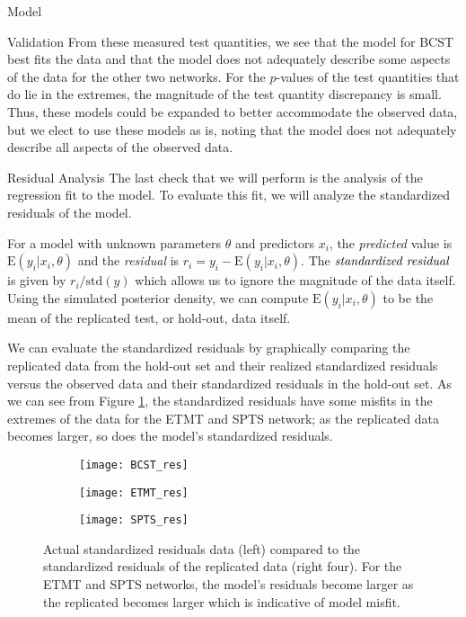 \begin{chapter}{Model}
\begin{section}{Validation}
    From these measured test quantities, we see that the model for BCST best fits the data and that
    the model does not adequately describe some aspects of the data for the other two networks.
    For the $p$-values of the test quantities that do lie in the extremes, the magnitude
    of the test quantity discrepancy is small. Thus, these models could be expanded to better accommodate
    the observed data, but we elect to use these models as is, noting that the
    model does not adequately describe all aspects of the observed data.

  \begin{subsection}{Residual Analysis}
    The last check that we will perform is the analysis of the regression fit to the
    model. To evaluate this fit, we will analyze the standardized residuals of the model.

    For a model with unknown parameters $\theta$ and predictors $x_i$, the \emph{predicted}
    value is $\text{E}(y_i | x_i, \theta)$ and the \emph{residual} is $r_i = y_i - \text{E}(y_i | x_i, \theta)$.
    The $\emph{standardized residual}$ is given by $r_i / \text{std}(y)$ which allows us to
    ignore the magnitude of the data itself. Using the simulated posterior density,
    we can compute $\text{E}(y_i | x_i, \theta)$
    to be the mean of the replicated test, or hold-out, data itself.

    We can evaluate the standardized residuals by graphically comparing the replicated data from the hold-out set
    and their realized standardized residuals versus the observed data and their standardized residuals in the hold-out set.
    As we can see from Figure \ref{fig:res}, the standardized residuals have some misfits in the extremes of the data
    for the ETMT and SPTS network; as the replicated data becomes larger, so does the model's standardized residuals.

    \begin{figure}[!h]
      \begin{subfigure}[b]{.75\textwidth}
        \centering
        \texttt{[image: BCST\_res]}
      \end{subfigure}
      \begin{subfigure}[b]{.75\textwidth}
        \centering
        \texttt{[image: ETMT\_res]}
      \end{subfigure}
      \begin{subfigure}[b]{.75\textwidth}
        \centering
        \texttt{[image: SPTS\_res]}
      \end{subfigure}
      \caption{Actual standardized residuals data (left) compared to the standardized residuals of the replicated data (right four). For the ETMT and SPTS
        networks, the model's residuals become larger as the replicated becomes larger which is indicative of model misfit.}
      \label{fig:res}
    \end{figure}


\end{subsection}
\end{section}
\end{chapter}
